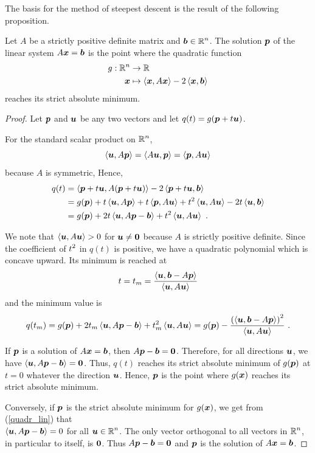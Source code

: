 The basis for the method of steepest descent is the
result of the following proposition.

\begin{prop}
Let $A$ be a strictly positive definite matrix and
$\displaystyle \bm{b}\in\mathbb{R}^n$.
The solution $\bm{p}$ of the linear system $A\bm{x} = \bm{b}$ is
the point where the quadratic function 
\begin{align*}
g:\mathbb{R}^n & \rightarrow \mathbb{R} \\
\bm{x} & \mapsto \left\langle{\bm{x}} , {A\bm{x}}\right\rangle - 2 \left\langle{\bm{x}} , {\bm{b}}\right\rangle
\end{align*}
reaches its strict absolute minimum.
\label{steepestdescgfunct}
\end{prop}

\begin{proof}
Let $\bm{p}$ and $\bm{u}$ be any two vectors and let
$q(t) = g(\bm{p}+t\bm{u})$.

For the standard scalar product on $\displaystyle \mathbb{R}^n$,
\[
\left\langle{\bm{u}} , {A\bm{p}}\right\rangle = \left\langle{A\bm{u}} , {\bm{p}}\right\rangle = \left\langle{\bm{p}} , {A\bm{u}}\right\rangle
\]
because $A$ is symmetric,  Hence,
\begin{align*}
q(t) &= \left\langle{\bm{p}+t\bm{u}} , {A(\bm{p}+t\bm{u})}\right\rangle
- 2 \left\langle{\bm{p}+t\bm{u}} , {\bm{b}}\right\rangle \\
&= g(\bm{p}) + t \left\langle{\bm{u}} , {A\bm{p}}\right\rangle + t\left\langle{\bm{p}} , {A\bm{u}}\right\rangle
+ t^2 \left\langle{\bm{u}} , {A\bm{u}}\right\rangle -2 t\left\langle{\bm{u}} , {\bm{b}}\right\rangle \\
&= g(\bm{p}) + 2t \left\langle{\bm{u}} , {A\bm{p}-\bm{b}}\right\rangle
+ t^2 \left\langle{\bm{u}} , {A\bm{u}}\right\rangle \ .
\end{align*}

We note that $\left\langle{\bm{u}} , {A\bm{u}}\right\rangle > 0$ for $\bm{u} \neq \bm{0}$
because $A$ is strictly positive definite.  Since the coefficient of
$\displaystyle t^2$ in $q(t)$ is positive, we have a quadratic
polynomial which is concave upward.  Its minimum is reached at
\[
t = t_m = \frac{\left\langle{\bm{u}} , {\bm{b} - A\bm{p}}\right\rangle}{\left\langle{\bm{u}} , {A\bm{u}}\right\rangle}
\]
and the minimum value is
\begin{equation}\label{quadr_lin}
q(t_m) = g(\bm{p}) + 2t_m \left\langle{\bm{u}} , {A\bm{p}-\bm{b}}\right\rangle
+ t_m^2 \left\langle{\bm{u}} , {A\bm{u}}\right\rangle
= g(\bm{p}) - \frac{ \left(\left\langle{\bm{u}} , {\bm{b}- A\bm{p}}\right\rangle\right)^2}
{\left\langle{\bm{u}} , {A\bm{u}}\right\rangle} \ .
\end{equation}

If $\bm{p}$ is a solution of $A\bm{x}=\bm{b}$, then
$A\bm{p} - \bm{b} = \bm{0}$.  Therefore, for all directions $\bm{u}$,
we have $\left\langle{\bm{u}} , {A\bm{p} - \bm{b}}\right\rangle = \bm{0}$.  Thus, $q(t)$
reaches its strict absolute minimum of $g(\bm{p})$ at $t=0$ whatever
the direction $\bm{u}$.  Hence, $\bm{p}$ is the point where $g(\bm{x})$
reaches its strict absolute minimum.

Conversely, if $\bm{p}$ is the strict absolute minimum for
$g(\bm{x})$, we get from (\ref{quadr_lin}) that \\
$\left\langle{\bm{u}} , {A\bm{p} - \bm{b}}\right\rangle = 0$ for all
$\displaystyle \bm{u} \in \mathbb{R}^n$.
The only vector orthogonal to all vectors in
$\displaystyle \mathbb{R}^n$, in particular to itself, is $\bm{0}$.
Thus $A\bm{p} - \bm{b}=\bm{0}$ and $\bm{p}$ is the solution of
$A\bm{x}=\bm{b}$.
\end{proof}

